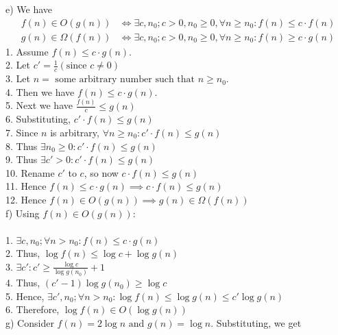 \documentclass[12pt]{report}
\newcommand{\no}{\noindent}
\newcommand{\tab}{\hspace*{.6cm}}
\begin{document}
	\no e) We have 
	\begin{align*}
	f(n) \in O(g(n)) &\iff \exists c, n_0;c > 0, n_0 \geq 0, \forall n \geq n_0: f(n) \leq c \cdot f(n)\\
	g(n) \in \Omega(f(n)) &\iff \exists c, n_0;c > 0, n_0 \geq 0, \forall n \geq n_0: f(n) \geq c \cdot g(n)
	\end{align*}
	\tab 1. Assume $f(n) \leq c \cdot g(n)$.\\
	\tab 2. Let $c' = \frac{1}{c} \left(\text{since } c \neq 0\right)$\\
	\tab 3. Let $n = \text{ some arbitrary number such that } n \geq n_0$.\\
	\tab 4. Then we have $f(n) \leq c \cdot g(n)$.\\
	\tab 5. Next we have $\frac{f(n)}{c} \leq g(n)$\\
	\tab 6. Substituting, $c' \cdot f(n) \leq g(n)$\\
	\tab 7. Since $n$ is arbitrary, $\forall n \geq n_0: c' \cdot f(n) \leq g(n)$\\
	\tab 8. Thus $\exists n_0 \geq 0 : c' \cdot f(n) \leq g(n)$\\
	\tab 9. Thus $\exists c' >0 : c' \cdot f(n) \leq g(n)$\\
	\tab 10. Rename $c'$ to $c$, so now $c \cdot f(n) \leq g(n)$\\
	\tab 11. Hence $f(n) \leq c \cdot g(n) \implies c \cdot f(n) \leq g(n)$\\
	\tab 12. Hence $f(n) \in O(g(n)) \implies g(n) \in \Omega(f(n))$\\
	
	\no f) Using $f(n) \in O(g(n))$:\\
	\\
	\tab 1. $\exists c, n_0; \forall n > n_0 : f(n) \leq c \cdot g(n)$\\
	\tab 2. Thus, $\log{f(n)} \leq \log{c} + \log{g(n)}$\\
	\tab 3. $\exists c' : c' \geq \frac{\log{c}}{\log{g(n_0)}} + 1$\\
	\tab 4. Thus, $(c' - 1)\log{g(n_0)} \geq \log{c}$\\
	\tab 5. Hence, $\exists c', n_0; \forall n > n_0:\log{f(n)} \leq \log{g(n)} \leq c'\log{g(n)}$\\
	\tab 6. Therefore, $\log{f(n)} \in O(\log{g(n)})$\\
	
	\no g) Consider $f(n) = 2\log{n} \text{ and } g(n) = \log{n}$. Substituting, we get \\
	
\end{document}
